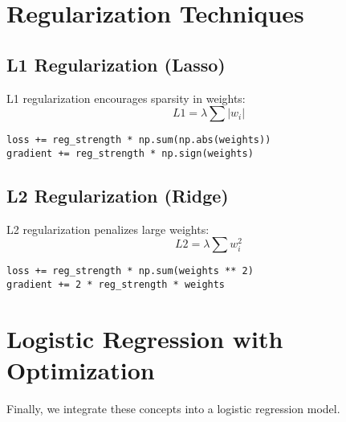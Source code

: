 \section{Regularization Techniques}

\subsection{L1 Regularization (Lasso)}
L1 regularization encourages sparsity in weights:
\begin{equation}
L1 = \lambda \sum |w_i|
\end{equation}

\begin{verbatim}
loss += reg_strength * np.sum(np.abs(weights))
gradient += reg_strength * np.sign(weights)
\end{verbatim}

\subsection{L2 Regularization (Ridge)}
L2 regularization penalizes large weights:
\begin{equation}
L2 = \lambda \sum w_i^2
\end{equation}

\begin{verbatim}
loss += reg_strength * np.sum(weights ** 2)
gradient += 2 * reg_strength * weights
\end{verbatim}

\section{Logistic Regression with Optimization}
Finally, we integrate these concepts into a logistic regression model.

